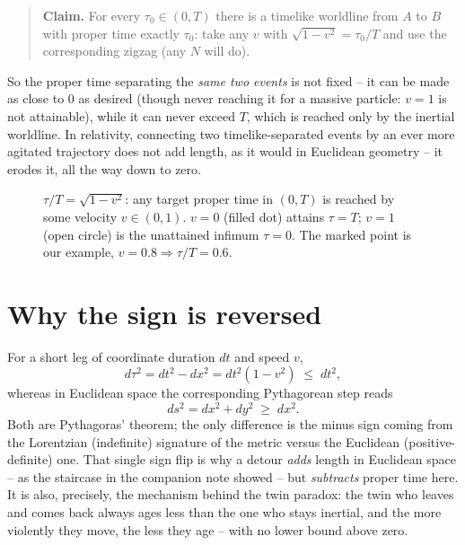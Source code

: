 \documentclass[11pt]{article}
\begin{document}
\begin{quote}
\textbf{Claim.} For every $\tau_0\in(0,T)$ there is a timelike worldline
from $A$ to $B$ with proper time exactly $\tau_0$: take any $v$ with
$\sqrt{1-v^2}=\tau_0/T$ and use the corresponding zigzag (any $N$ will do).
\end{quote}

So the proper time separating the \emph{same two events} is not fixed --
it can be made as close to $0$ as desired (though never reaching it for a
massive particle: $v=1$ is not attainable), while it can never exceed $T$,
which is reached only by the inertial worldline. In relativity, connecting
two timelike-separated events by an ever more agitated trajectory does not
add length, as it would in Euclidean geometry -- it erodes it, all the way
down to zero.

\begin{figure}[h]
\centering
{}
\caption{$\tau/T=\sqrt{1-v^2}$: any target proper time in $(0,T)$ is reached
by some velocity $v\in(0,1)$. $v=0$ (filled dot) attains $\tau=T$; $v=1$
(open circle) is the unattained infimum $\tau=0$. The marked point is our
example, $v=0.8\Rightarrow\tau/T=0.6$.}
\label{fig:tau}
\end{figure}

\section{Why the sign is reversed}

For a short leg of coordinate duration $dt$ and speed $v$,
$$d\tau^2 = dt^2 - dx^2 = dt^2(1-v^2) \;\le\; dt^2,$$
whereas in Euclidean space the corresponding Pythagorean step reads
$$ds^2 = dx^2+dy^2 \;\ge\; dx^2.$$
Both are Pythagoras' theorem; the only difference is the minus sign coming
from the Lorentzian (indefinite) signature of the metric versus the
Euclidean (positive-definite) one. That single sign flip is why a detour
\emph{adds} length in Euclidean space -- as the staircase in the companion
note showed -- but \emph{subtracts} proper time here. It is also, precisely,
the mechanism behind the twin paradox: the twin who leaves and comes back
always ages less than the one who stays inertial, and the more violently
they move, the less they age -- with no lower bound above zero.
\end{document}
